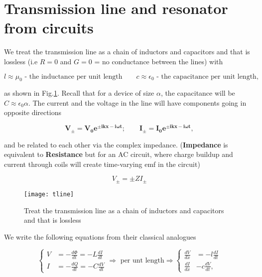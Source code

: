 
\section{Transmission       line       and       resonator       from
  circuits}\label{sec:transmission-line}

We treat the transmission line as a chain of inductors and capacitors
and  that is  lossless (i.e  $ R=0  $ and  $ G=0  $ =  no conductance
between the lines) with

  \begin{equation}
    l \approx \mu_0 \text{ - the inductance per unit length}\qquad c \approx \epsilon_0 \text{ - the capacitance per unit length},
  \end{equation}

  \noindent  as shown  in  Fig.\ref{transtLine}.  Recall  that for  a
  device   of    size   $    \alpha   $,    the   capacitance    will   be
  $ C \approx \epsilon_0\alpha $.  The  current and the voltage in the line
  will have components going in opposite directions

  \begin{equation}
    \label{tlineCurrentVoltage}
    \mathbf{V_{\pm} = V_0e^{\pm ikx-i\omega t};\qquad I_{\pm} = I_0e^{\pm ikx-i\omega t}},
  \end{equation}

  \noindent and be  related to each other via  the complex impedance.
  (\textbf{Impedance} is equivalent to \textbf{Resistance} but for an
  AC circuit,  where charge  buildup and  current through  coils will
  create time-varying emf in the circuit)

 \begin{equation}
   V_{\pm}= \pm ZI_{\pm}
 \end{equation}

 \begin{figure}[h]
   \caption{Treat the transmission  line as a chain  of inductors and
     capacitors and that is lossless \label{transtLine}}
   \texttt{[image: tline]}
 \end{figure}

 \noindent  We write  the  following equations  from their  classical
 analogues

 \begin{equation}
   \left\lbrace \begin{aligned}
       V & = -\frac{d\Phi}{dt} = -L\frac{dI}{dt}\\
       I & = -\frac{dQ}{dt} = -C\frac{dV}{dt}
     \end{aligned}\right.\Rightarrow \text{ per unt length} \Rightarrow
   \left\lbrace \begin{aligned}
       \frac{dV}{dx} & = - l\frac{dI}{dt}\\
       \frac{dI}{dx} & - c\frac{dV}{dt},
     \end{aligned}\right.
   \label{tlineDiff}
 \end{equation}

